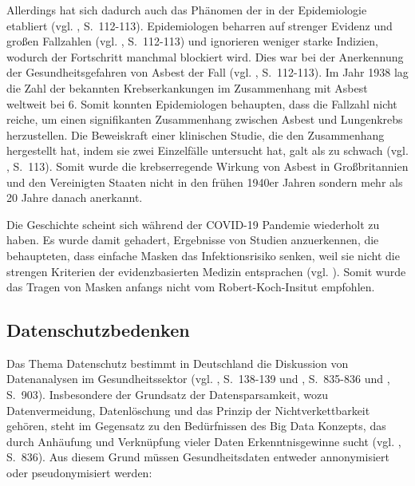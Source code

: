 Allerdings hat sich dadurch auch das Phänomen der \grqq{} in der Epidemiologie etabliert
(vgl. \cite{Proctor}, S.~112-113).
Epidemiologen beharren auf strenger Evidenz und großen Fallzahlen (vgl. \cite{Proctor}, S.~112-113) und ignorieren weniger 
starke Indizien, wodurch der Fortschritt manchmal blockiert wird. Dies war bei der Anerkennung der Gesundheitsgefahren
von Asbest der Fall (vgl. \cite{Proctor}, S.~112-113). Im Jahr 1938 lag die Zahl der bekannten Krebserkankungen im Zusammenhang mit
Asbest weltweit bei 6. Somit konnten Epidemiologen behaupten, dass die Fallzahl nicht reiche, um einen signifikanten Zusammenhang
zwischen Asbest und Lungenkrebs herzustellen. Die Beweiskraft einer klinischen Studie, die den Zusammenhang hergestellt hat, indem sie
zwei Einzelfälle untersucht hat, galt als zu schwach (vgl. \cite{Proctor}, S.~113). Somit wurde die krebserregende Wirkung von Asbest
in Großbritannien und den Vereinigten Staaten nicht in den frühen 1940er Jahren sondern mehr als 20 Jahre danach anerkannt.

Die Geschichte scheint sich während der COVID-19 Pandemie wiederholt zu haben. Es wurde damit gehadert, Ergebnisse von Studien anzuerkennen,
die behaupteten, dass einfache Masken das Infektionsrisiko senken, weil sie nicht die strengen Kriterien der evidenzbasierten Medizin
entsprachen (vgl. \cite{Jotten}). Somit wurde das Tragen von Masken anfangs nicht vom Robert-Koch-Insitut empfohlen.

\subsection{Datenschutzbedenken}

Das Thema Datenschutz bestimmt in Deutschland die Diskussion von Datenanalysen
im Gesundheitssektor (vgl. \cite{Jorzig}, S.~138-139 und \cite{Weichert}, S.~835-836 und \cite{Moebus}, S.~903). 
Insbesondere der Grundsatz der Datensparsamkeit, wozu Datenvermeidung, Datenlöschung und das Prinzip der Nichtverkettbarkeit gehören,
steht im Gegensatz zu den Bedürfnissen des Big Data Konzepts, das durch Anhäufung und Verknüpfung vieler Daten Erkenntnisgewinne
sucht (vgl. \cite{Weichert}, S.~836). Aus diesem Grund müssen Gesundheitsdaten entweder annonymisiert oder pseudonymisiert werden:

